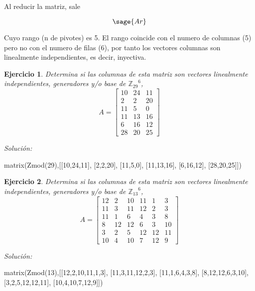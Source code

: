 \documentclass{amsart}
\newtheorem{ejer}{Ejercicio}
\begin{document}
Al reducir la matriz, sale

$$
	\sage{Ar}
$$

Cuyo rango (n de pivotes) es 5. El rango coincide con el numero de columnas (5) pero no con el numero de filas (6), por tanto los vectores columnas son linealmente independientes, es decir, inyectiva.



\begin{ejer} Determina si las columnas de esta matriz son vectores linealmente independientes, generadores y/o base de ${{\mathbb Z}_{29}}^{6}$,
\[ A = \left[\begin{array}{rrr}
10 & 24 & 11 \\
2 & 2 & 20 \\
11 & 5 & 0 \\
11 & 13 & 16 \\
6 & 16 & 12 \\
28 & 20 & 25
\end{array}\right] \]
\end{ejer}

{\it Soluci\'on:}

\begin{sageblock}
matrix(Zmod(29),[[10,24,11],
[2,2,20],
[11,5,0],
[11,13,16],
[6,16,12],
[28,20,25]])
\end{sageblock}



\begin{ejer} Determina si las columnas de esta matriz son vectores linealmente independientes, generadores y/o base de ${{\mathbb Z}_{13}}^{6}$,
\[ A = \left[\begin{array}{rrrrrr}
12 & 2 & 10 & 11 & 1 & 3 \\
11 & 3 & 11 & 12 & 2 & 3 \\
11 & 1 & 6 & 4 & 3 & 8 \\
8 & 12 & 12 & 6 & 3 & 10 \\
3 & 2 & 5 & 12 & 12 & 11 \\
10 & 4 & 10 & 7 & 12 & 9
\end{array}\right] \]
\end{ejer}

{\it Soluci\'on:}

\begin{sageblock}
matrix(Zmod(13),[[12,2,10,11,1,3],
[11,3,11,12,2,3],
[11,1,6,4,3,8],
[8,12,12,6,3,10],
[3,2,5,12,12,11],
[10,4,10,7,12,9]])
\end{sageblock}
\end{document}
